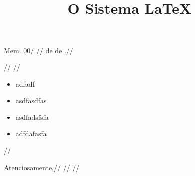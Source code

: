 \documentclass[11pt, a4paper]{article}
\title{O Sistema \LaTeX}
\begin{document}
			Mem. 00/ //
			\hfill  de  de .//
			
			//
			//
			\begin{itemize} 
\item adfadf
\item asdfasdfas
\item asdfadsfsfa
\item adfdafasfa
\end{itemize} //
			
			\begin{center}
				Atenciosamente,//
				//
				//
			\end{center}
		
\end{document}
